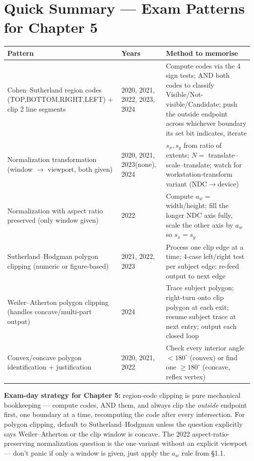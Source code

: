 \documentclass[12pt, a4paper]{article}
\newenvironment{notesbox}{\begin{mdframed}[style=notesframe]}{\end{mdframed}}
\begin{document}
\section{Quick Summary --- Exam Patterns for Chapter 5}

\begin{center}
\renewcommand{\arraystretch}{1.3}
\begin{tabular}{p{4.7cm}|p{2.7cm}|p{6.6cm}}
\toprule
\textbf{Pattern} & \textbf{Years} & \textbf{Method to memorise} \\
\midrule
Cohen--Sutherland region codes (TOP,BOTTOM,RIGHT,LEFT) + clip 2 line segments & 2020, 2021, 2022, 2023, 2024 & Compute codes via the 4 sign tests; AND both codes to classify Visible/Not-visible/Candidate; push the outside endpoint across whichever boundary its set bit indicates, iterate \\
Normalization transformation (window $\to$ viewport, both given) & 2020, 2021, 2023(none), 2024 & $s_x,s_y$ from ratio of extents; $N=$ translate--scale--translate; watch for workstation-transform variant (NDC$\to$device) \\
Normalization with aspect ratio preserved (only window given) & 2022 & Compute $a_w=$ width/height; fill the longer NDC axis fully, scale the other axis by $a_w$ so $s_x=s_y$ \\
Sutherland--Hodgman polygon clipping (numeric or figure-based) & 2021, 2022, 2023 & Process one clip edge at a time; 4-case left/right test per subject edge; re-feed output to next edge \\
Weiler--Atherton polygon clipping (handles concave/multi-part output) & 2024 & Trace subject polygon; right-turn onto clip polygon at each exit; resume subject trace at next entry; output each closed loop \\
Convex/concave polygon identification + justification & 2020, 2021, 2022 & Check every interior angle $<180^\circ$ (convex) or find one $\ge180^\circ$ (concave, reflex vertex) \\
\bottomrule
\end{tabular}
\end{center}

\begin{notesbox}
\textbf{Exam-day strategy for Chapter 5:} region-code clipping is pure mechanical bookkeeping --- compute codes, AND them, and always clip the \emph{outside} endpoint first, one boundary at a time, recomputing the code after every intersection. For polygon clipping, default to Sutherland--Hodgman unless the question explicitly says Weiler--Atherton or the clip window is concave. The 2022 aspect-ratio-preserving normalization question is the one variant without an explicit viewport --- don't panic if only a window is given, just apply the $a_w$ rule from \S1.1.
\end{notesbox}
\end{document}
